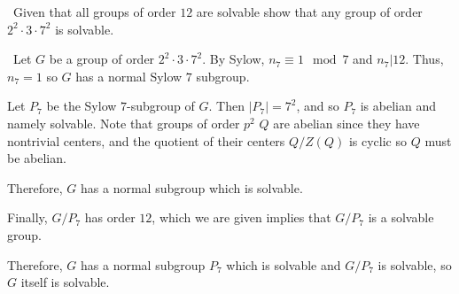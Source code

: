 \documentclass[12pt]{Qual}
\begin{document}
\begin{problem} $\,$
Given that all groups of order $12$ are solvable show that any group of order $2^2\cdot 3\cdot 7^2$ is solvable.
\end{problem}


\begin{solution}$\,$
Let $G$ be a group of order $2^2\cdot 3\cdot 7^2$. By Sylow, $n_7\equiv 1\mod 7$ and $n_7|12$. Thus, $n_7=1$ so $G$ has a normal Sylow $7$ subgroup.

Let $P_7$ be the Sylow $7$-subgroup of $G$. Then $|P_7|=7^2$, and so $P_7$ is abelian and namely solvable. Note that groups of order $p^2$ $Q$ are abelian since they have nontrivial centers, and the quotient of their centers $Q/Z(Q)$ is cyclic so $Q$ must be abelian.

Therefore, $G$ has a normal subgroup which is solvable.

Finally, $G/P_7$ has order $12$, which we are given implies that $G/P_7$ is a solvable group.

Therefore, $G$ has a normal subgroup $P_7$ which is solvable and $G/P_7$ is solvable, so $G$ itself is solvable.
\end{solution}
\newpage
\end{document}
